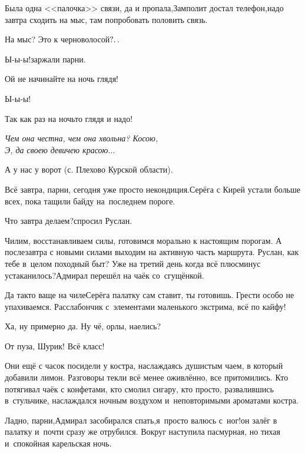 \diagdash Была одна <<палочка>> связи, да и пропала,\mdash Замполит достал телефон,\mdash надо завтра сходить на мыс, там попробовать половить связь.

\diagdash На мыс? Это к черноволосой$\mathpunct{?\ldotp\ldotp}$ %

\diagdash Ы-ы-ы!\mdash заржали парни.

\diagdash Ой не начинайте на ночь глядя!

\diagdash Ы-ы-ы!

\diagdash Так как раз на ночь\sdash то глядя и надо!

\newpage

\noindent\textit{%
	\hspace*{1.5cm}Чем она честна, чем она хвольна? Косою,\\
	\hspace*{1.5cm}Э, да своею девичею красою$\ldots$
}

{\raggedleft \scriptsize \mdash А у нас у ворот (с. Плехово Курской области). \par}


\diagdash Всё завтра, парни, сегодня уже просто некондиция.\mdash Серёга с Кирей устали больше всех, пока тащили байду на~последнем пороге.

\diagdash Что завтра делаем?\mdash спросил Руслан.

\diagdash Чилим, восстанавливаем силы, готовимся морально к настоящим порогам. А послезавтра с новыми силами выходим на активную часть маршрута. Руслан, как тебе в~целом походный быт? Уже на третий  день когда всё плюс\sdash минус устаканилось?\mdash Адмирал перешёл на чаёк со~сгущёнкой.

\diagdash Да так\sdash то ваще на чиле\mdash Серёга палатку сам ставит, ты готовишь. Грести особо не упахиваемся. Расслабончик с~элементами маленького экстрима, всё по кайфу!

\diagdash Ха, ну примерно да. Ну чё, орлы, наелись?

\diagdash От пуза, Шурик! Всё класс!

Они ещё с часок посидели у костра, наслаждаясь душистым чаем, в который добавили лимон. Разговоры текли всё менее оживлённо, все притомились. Кто потягивал чаёк с конфетами, кто смолил сигару, кто просто, развалившись в~стульчике, наслаждался ночным воздухом и~неповторимыми ароматами костра.

\diagdash Ладно, парни,\mdash Адмирал засобирался спать,\mdash я~просто валюсь с~ног!\mdash он залёг в палатку и~почти сразу же отрубился. Вокруг наступила пасмурная, но тихая и~спокойная карельская ночь.


\vspace{-0.2cm}
\begin{center}
\end{center}
